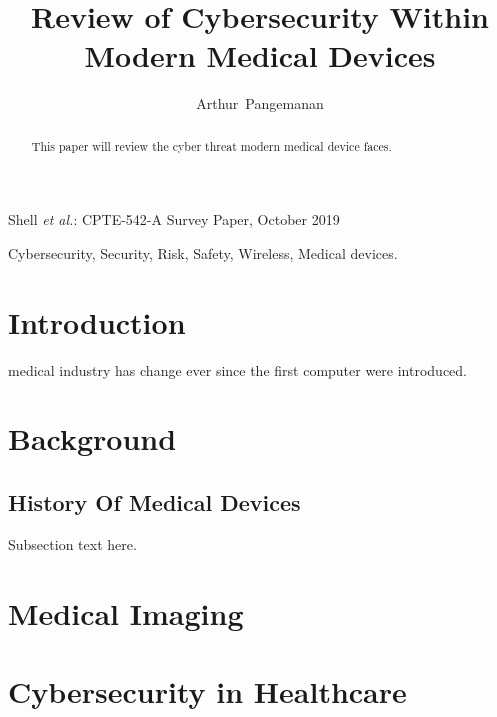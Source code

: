\documentclass{IEEEtran}
\begin{document}
%
\title{Review of Cybersecurity Within Modern Medical Devices}


\author{Arthur~Pangemanan}%



%
{Shell \MakeLowercase{\textit{et al.}}: CPTE-542-A Survey Paper, October 2019}

\maketitle

\begin{abstract}
	
	
	This paper will review the cyber threat modern medical device faces.
\end{abstract}

\begin{IEEEkeywords}
Cybersecurity, Security, Risk, Safety, Wireless, Medical devices.
\end{IEEEkeywords}


\section{Introduction}
 medical industry has change ever since the first computer were introduced. 

\section{Background}
\subsection{History Of Medical Devices}
Subsection text here.


\section{Medical Imaging}

\section{Cybersecurity in Healthcare}
\end{document}
